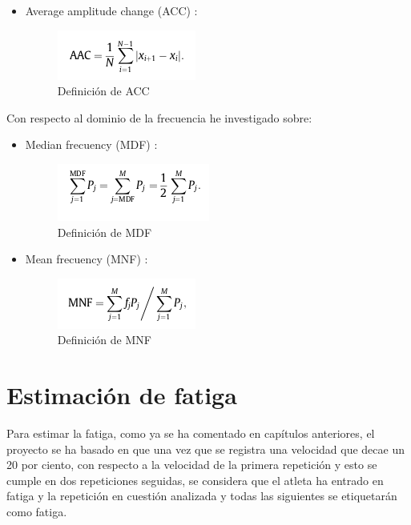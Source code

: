 \begin{itemize}
\item Average amplitude change (ACC) \cite{phinyomark2012feature}:
    \begin{figure}[!ht]
        \centering
        \includegraphics[scale=0.8]{imagenes/formula de caracteristicas/acc.png}
        \caption{ Definición de ACC \cite{phinyomark2012feature}}
        \label{fig:acc1}
    \end{figure}
\end{itemize}

Con respecto al dominio de la frecuencia he investigado sobre:
\begin{itemize}
\item Median frecuency (MDF) \cite{phinyomark2012feature}:
    
    \begin{figure}[!ht]
        \centering
        \includegraphics[scale=0.8]{imagenes/formula de caracteristicas/mdf.png}
        \caption{ Definición de MDF \cite{phinyomark2012feature}}
        \label{fig:mdf1}
    \end{figure}

\item Mean frecuency (MNF) \cite{phinyomark2012feature}:
    \begin{figure}[!ht]
        \centering
        \includegraphics[scale=0.8]{imagenes/formula de caracteristicas/mnf.png}
        \caption{ Definición de MNF \cite{phinyomark2012feature}}
        \label{fig:mnf1}
    \end{figure}
\end{itemize}

\newpage
\section{Estimación de fatiga}
Para estimar la fatiga, como ya se ha comentado en capítulos anteriores, el proyecto se ha basado en que una vez que se registra una velocidad que decae un 20 por ciento, con respecto a la velocidad de la primera repetición y esto se cumple en dos repeticiones seguidas, se considera que el atleta ha entrado en fatiga y la repetición en cuestión analizada y todas las siguientes se etiquetarán como fatiga.


